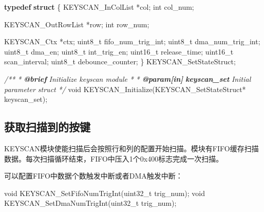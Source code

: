 \documentclass[
  12pt,
]{book}
\newenvironment{Shaded}{\begin{snugshade}}{\end{snugshade}}
\newcommand{\AnnotationTok}[1]{\textcolor[rgb]{0.56,0.35,0.01}{\textbf{\textit{#1}}}}
\newcommand{\CommentTok}[1]{\textcolor[rgb]{0.56,0.35,0.01}{\textit{#1}}}
\newcommand{\CommentVarTok}[1]{\textcolor[rgb]{0.56,0.35,0.01}{\textbf{\textit{#1}}}}
\newcommand{\DataTypeTok}[1]{\textcolor[rgb]{0.13,0.29,0.53}{#1}}
\newcommand{\KeywordTok}[1]{\textcolor[rgb]{0.13,0.29,0.53}{\textbf{#1}}}
\newcommand{\NormalTok}[1]{#1}
\begin{document}
\begin{Shaded}
\begin{Highlighting}[]
\KeywordTok{typedef} \KeywordTok{struct}\NormalTok{ \{}
\NormalTok{    KEYSCAN_InColList *col;}
    \DataTypeTok{int}\NormalTok{ col_num;}

\NormalTok{    KEYSCAN_OutRowList *row;}
    \DataTypeTok{int}\NormalTok{ row_num;}

\NormalTok{    KEYSCAN_Ctx *ctx;}
    \DataTypeTok{uint8_t}\NormalTok{ fifo_num_trig_int;}
    \DataTypeTok{uint8_t}\NormalTok{ dma_num_trig_int;}
    \DataTypeTok{uint8_t}\NormalTok{ dma_en;}
    \DataTypeTok{uint8_t}\NormalTok{ int_trig_en;}
    \DataTypeTok{uint16_t}\NormalTok{ release_time;}
    \DataTypeTok{uint16_t}\NormalTok{ scan_interval;}
    \DataTypeTok{uint8_t}\NormalTok{ debounce_counter;}
\NormalTok{\} KEYSCAN_SetStateStruct;}
\end{Highlighting}
\end{Shaded}

\begin{Shaded}
\begin{Highlighting}[]
\CommentTok{/**}
\CommentTok{ * }\AnnotationTok{@brief}\CommentTok{ Initialize keyscan module}
\CommentTok{ *}
\CommentTok{ * }\AnnotationTok{@param[in]}\CommentTok{ }\CommentVarTok{keyscan_set}\CommentTok{       Initial parameter struct}
\CommentTok{ */}
\DataTypeTok{void}\NormalTok{ KEYSCAN_Initialize(KEYSCAN_SetStateStruct* keyscan_set);}
\end{Highlighting}
\end{Shaded}

\hypertarget{ux83b7ux53d6ux626bux63cfux5230ux7684ux6309ux952e}{%
\subsection{获取扫描到的按键}\label{ux83b7ux53d6ux626bux63cfux5230ux7684ux6309ux952e}}

KEYSCAN模块使能扫描后会按照行和列的配置开始扫描。模块有FIFO缓存扫描数据。每次扫描循环结束，FIFO中压入1个0x400标志完成一次扫描。

可以配置FIFO中数据个数触发中断或者DMA触发中断：

\begin{Shaded}
\begin{Highlighting}[]
\DataTypeTok{void}\NormalTok{ KEYSCAN_SetFifoNumTrigInt(}\DataTypeTok{uint32_t}\NormalTok{ trig_num);}
\DataTypeTok{void}\NormalTok{ KEYSCAN_SetDmaNumTrigInt(}\DataTypeTok{uint32_t}\NormalTok{ trig_num);}
\end{Highlighting}
\end{Shaded}
\end{document}
